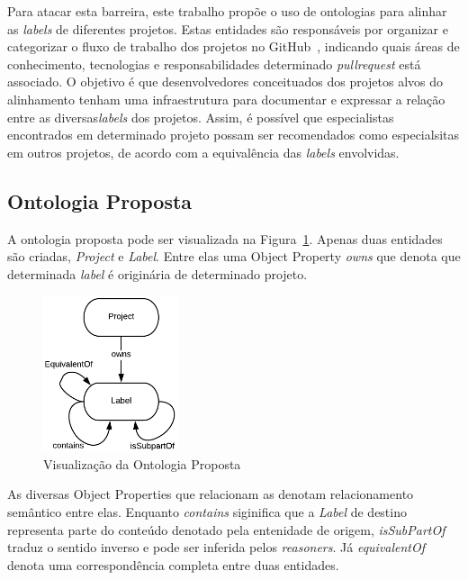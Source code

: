 \documentclass[peerreview]{acmart}
\begin{document}
Para atacar esta barreira, este trabalho propõe o uso de ontologias para alinhar as \textit{labels} de diferentes projetos. Estas entidades são responsáveis por organizar e categorizar o fluxo de trabalho dos projetos no GitHub~\cite{gousios2014}, indicando quais áreas de conhecimento, tecnologias e responsabilidades determinado \textit{pullrequest} está associado. O objetivo é que desenvolvedores conceituados dos projetos alvos do alinhamento tenham uma infraestrutura para documentar e expressar a relação entre as diversas\textit{labels} dos projetos. Assim, é possível que especialistas encontrados em determinado projeto possam ser recomendados como especialsitas em outros projetos, de acordo com a equivalência das \textit{labels} envolvidas.

\subsection{Ontologia Proposta}

A ontologia proposta pode ser visualizada na Figura~\ref{fig:ontologia}. Apenas duas entidades são criadas, \textit{Project} e \textit{Label}. Entre elas uma Object Property \textit{owns} que denota que determinada \textit{label} é originária de determinado projeto.

\begin{figure}[!htbp]
\centering
 \includegraphics[width=150]{ontologia}
 \caption{Visualização da Ontologia Proposta}\label{fig:ontologia}
\end{figure}

As diversas Object Properties que relacionam as  denotam relacionamento semântico entre elas. Enquanto \textit{contains} siginifica que a \textit{Label} de destino representa parte do conteúdo denotado pela entenidade de origem, \textit{isSubPartOf} traduz o sentido inverso e pode ser inferida pelos \textit{reasoners}. Já \textit{equivalentOf} denota uma correspondência completa entre duas entidades.
\end{document}
